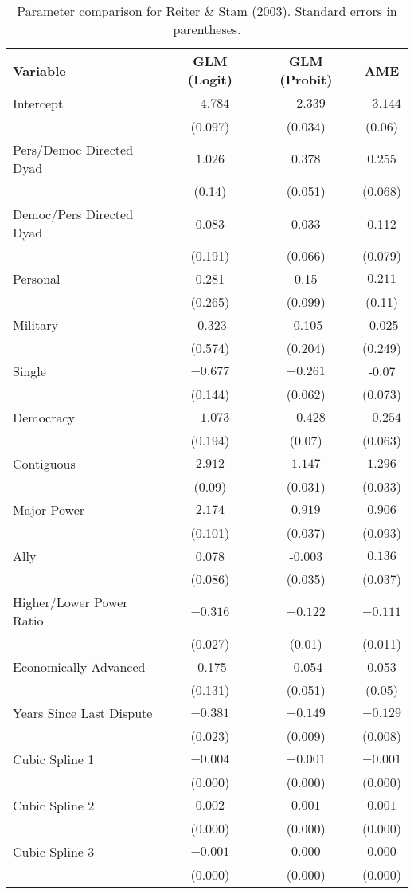 \begin{table}[ht]
\centering
\begingroup\normalsize
\begin{tabular}{lccc}
 Variable & GLM (Logit) & GLM (Probit) & AME \\ 
  \hline
\hline
Intercept & $-4.784$ & $-2.339$ & $-3.144$ \\
   & (0.097) & (0.034) & (0.06) \\ 
  Pers/Democ Directed Dyad & $1.026$ & $0.378$ & $0.255$ \\
   & (0.14) & (0.051) & (0.068) \\ 
  Democ/Pers Directed Dyad & 0.083 & 0.033 & 0.112 \\ 
   & (0.191) & (0.066) & (0.079) \\ 
  Personal & 0.281 & 0.15 & $0.211$ \\ 
   & (0.265) & (0.099) & (0.11) \\ 
  Military & -0.323 & -0.105 & -0.025 \\ 
   & (0.574) & (0.204) & (0.249) \\ 
  Single & $-0.677$ & $-0.261$ & -0.07 \\
   & (0.144) & (0.062) & (0.073) \\ 
  Democracy & $-1.073$ & $-0.428$ & $-0.254$ \\
   & (0.194) & (0.07) & (0.063) \\ 
  Contiguous & $2.912$ & $1.147$ & $1.296$ \\
   & (0.09) & (0.031) & (0.033) \\ 
  Major Power & $2.174$ & $0.919$ & $0.906$ \\
   & (0.101) & (0.037) & (0.093) \\ 
  Ally & 0.078 & -0.003 & $0.136$ \\
   & (0.086) & (0.035) & (0.037) \\ 
  Higher/Lower Power Ratio & $-0.316$ & $-0.122$ & $-0.111$ \\
   & (0.027) & (0.01) & (0.011) \\ 
  Economically Advanced & -0.175 & -0.054 & 0.053 \\ 
   & (0.131) & (0.051) & (0.05) \\ 
  Years Since Last Dispute & $-0.381$ & $-0.149$ & $-0.129$ \\
   & (0.023) & (0.009) & (0.008) \\ 
  Cubic Spline 1 & $-0.004$ & $-0.001$ & $-0.001$ \\
   & (0.000) & (0.000) & (0.000) \\ 
  Cubic Spline 2 & $0.002$ & $0.001$ & $0.001$ \\
   & (0.000) & (0.000) & (0.000) \\ 
  Cubic Spline 3 & $-0.001$ & $0.000$ & $0.000$ \\
   & (0.000) & (0.000) & (0.000) \\ 
   \hline
\hline
\end{tabular}
\endgroup
\caption{Parameter comparison for Reiter \& Stam (2003). Standard errors in parentheses. } 
\label{tab:reiter_stam_coef}
\end{table}
